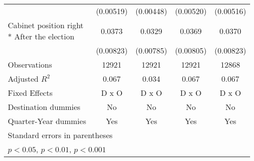 \begin{table}[htbp]
\begin{tabular}{l*{4}{c}}
                    &   (0.00519)         &   (0.00448)         &   (0.00520)         &   (0.00516)         \\
[1em]
Cabinet position right * After the election&      0.0373\sym{***}&      0.0329\sym{***}&      0.0369\sym{***}&      0.0370\sym{***}\\
                    &   (0.00823)         &   (0.00785)         &   (0.00805)         &   (0.00823)         \\
\hline
Observations        &       12921         &       12921         &       12921         &       12868         \\
Adjusted \(R^{2}\)  &       0.067         &       0.034         &       0.067         &       0.067         \\
Fixed Effects       &       D x O         &       D x O         &       D x O         &       D x O         \\
Destination dummies &          No         &          No         &          No         &          No         \\
Quarter-Year dummies&         Yes         &         Yes         &         Yes         &         Yes         \\
\hline\hline
\multicolumn{5}{l}{\footnotesize Standard errors in parentheses}\\
\multicolumn{5}{l}{\footnotesize \sym{*} \(p<0.05\), \sym{**} \(p<0.01\), \sym{***} \(p<0.001\)}\\
\end{tabular}
\end{table}
